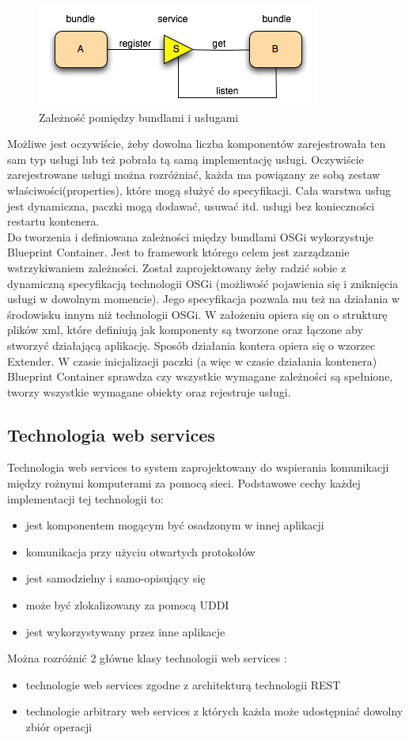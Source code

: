 \begin{figure}[!h]
	\centering
	\includegraphics[scale=0.75]{serveLayer.png} 
	\caption{Zależność pomiędzy bundlami i usługami}
\end{figure}
 Możliwe jest oczywiście, żeby dowolna liczba komponentów zarejestrowała ten sam typ usługi lub też pobrała tą samą implementację usługi. Oczywiście zarejestrowane usługi można rozróżniać, każda ma powiązany ze sobą zestaw właściwości(properties), które mogą służyć do specyfikacji. Cała warstwa usług jest dynamiczna, paczki mogą dodawać, usuwać itd. usługi bez konieczności restartu kontenera.  \\
Do tworzenia i definiowana zależności między bundlami OSGi wykorzystuje Blueprint Container. Jest to framework którego celem jest zarządzanie wstrzykiwaniem zależności. Został zaprojektowany żeby radzić sobie z dynamiczną specyfikacją technologii OSGi (możliwość pojawienia się i zniknięcia usługi w dowolnym momencie). Jego specyfikacja pozwala mu też na działania w środowisku innym niż technologii OSGi. W założeniu opiera się on o strukturę plików xml, które definiują jak komponenty są tworzone oraz łączone aby stworzyć działającą aplikację. Sposób działania kontera opiera się o wzorzec Extender. W czasie inicjalizacji paczki (a więc w czasie działania kontenera) Blueprint Container sprawdza czy wszystkie wymagane zależności są spełnione, tworzy wszystkie wymagane obiekty oraz rejestruje usługi. 

\subsection{Technologia web services}
Technologia web services to system zaprojektowany do wspierania komunikacji między rożnymi komputerami za pomocą sieci.  Podstawowe cechy każdej implementacji tej technologii to:
\begin{itemize}
	\item jest komponentem mogącym być osadzonym w innej aplikacji
	\item komunikacja przy użyciu otwartych protokołów
	\item jest samodzielny i samo-opisujący się
	\item może być zlokalizowany za pomocą UDDI
	\item jest wykorzystywany przez inne aplikacje
\end{itemize}  
Można rozróżnić 2 główne klasy technologii web services :
\begin{itemize}
	\item technologie web services zgodne z architekturą technologii REST
	\item technologie arbitrary web services z których każda może udostępniać dowolny zbiór operacji
\end{itemize}  
